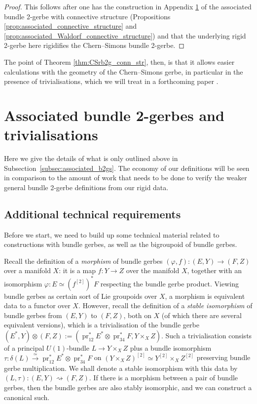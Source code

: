 \documentclass[12pt]{amsart}
\DeclareMathOperator{\pr}{pr}
\theoremstyle{plain}
\theoremstyle{definition}
\theoremstyle{remark}
\numberwithin{equation}{section}
\newcommand{\<}{\langle}
\renewcommand{\>}{\rangle}
\begin{document}
\begin{proof}
This follows after one has the construction in Appendix \ref{app:weak_2-gerbes} of the associated bundle 2-gerbe with connective structure (Propositions \ref{prop:associated_connective_structure} and \ref{prop:associated_Waldorf_connective_structure}) and that the underlying rigid 2-gerbe here rigidifies the Chern--Simons bundle 2-gerbe.
\end{proof}

The point of Theorem \ref{thm:CSrb2g_conn_str}, then, is that it allows easier calculations with the geometry of the Chern--Simons gerbe, in particular in the presence of trivialisations, which we will treat in a forthcoming paper \cite{rb2g_III}.









\appendix



\section{Associated bundle 2-gerbes and trivialisations}
\label{app:weak_2-gerbes}


Here we give the details of what is only outlined above in Subsection~\ref{subsec:associated_b2gs}.
The economy of our definitions will be seen in comparison to the amount of work that needs to be done to verify the weaker general bundle 2-gerbe definitions from our rigid data.


\subsection{Additional technical requirements}


Before we start, we need to build up some technical material related to constructions with bundle gerbes, as well as the bigroupoid of bundle gerbes.

Recall the definition of a \emph{morphism} of bundle gerbes $(\varphi,f)\colon (E,Y)\to (F,Z)$ over a manifold $X$: it is a map $f\colon Y\to Z$ over the manifold $X$, together with an isomorphism $\varphi\colon E\simeq (f^{[2]})^* F$ respecting the bundle gerbe product. 
Viewing bundle gerbes as certain sort of Lie groupoids over $X$, a morphism is equivalent data to a functor over $X$. 
However, recall the definition of a \emph{stable isomorphism} of bundle gerbes from $(E,Y)$ to $(F,Z)$, both on $X$ (of which there are several equivalent versions), which is a trivialisation of the bundle gerbe $(E^*,Y)\otimes (F,Z) := \left(\pr_{12}^*E^*\otimes \pr_{34}^*F,Y\times_X Z\right)$.
Such a trivialisation consists of a principal $U(1)$-bundle $L\to Y\times_XZ$ plus a bundle isomorphism $\tau\colon \delta(L)\xrightarrow{\simeq} \pr_{12}^*E^*\otimes \pr_{34}^* F$ on $(Y\times_X Z)^{[2]}\simeq Y^{[2]}\times_X Z^{[2]}$ preserving bundle gerbe multiplication. 
We shall denote a stable isomorphism with this data by $(L,\tau)\colon (E,Y) \rightsquigarrow (F,Z)$.
If there is a morphism between a pair of bundle gerbes, then the bundle gerbes are also stably isomorphic, and we can construct a canonical such.
\end{document}

